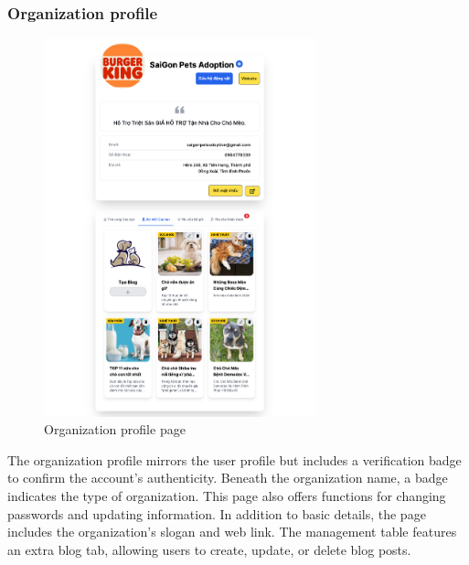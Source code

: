 \subsubsection{Organization profile}
\begin{figure}[H]
    \centering
    \includegraphics[width=0.7\textwidth]{Figures/UI/org_profile_ui.png}
    \caption{Organization profile page}
\end{figure}

The organization profile mirrors the user profile but includes a verification badge to confirm the account's authenticity. Beneath the organization name, a badge indicates the type of organization. This page also offers functions for changing passwords and updating information. In addition to basic details, the page includes the organization's slogan and web link. The management table features an extra blog tab, allowing users to create, update, or delete blog posts.

